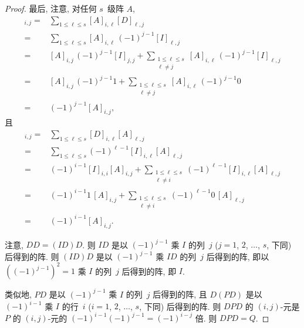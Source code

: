 \documentclass[../libro.tex]{subfiles}
\begin{document}
\begin{proof}
    最后, 注意, 对任何 \(s\)~级阵 \(A\),
    \begin{align*}
        [A D]_{i,j}
        = {} &
        \sum_{1 \leq \ell \leq s} {[A]_{i,\ell} [D]_{\ell,j}}
        \\
        = {} &
        \sum_{1 \leq \ell \leq s} {[A]_{i,\ell}\, (-1)^{j-1} [I]_{\ell,j}}
        \\
        = {} &
        [A]_{i,j}\, (-1)^{j-1} [I]_{j,j}
        + \sum_{\substack{1 \leq \ell \leq s \\ \ell \neq j}}
        {[A]_{i,\ell}\, (-1)^{j-1} [I]_{\ell,j}}
        \\
        = {} &
        [A]_{i,j}\, (-1)^{j-1} 1
        + \sum_{\substack{1 \leq \ell \leq s \\ \ell \neq j}}
        {[A]_{i,\ell}\, (-1)^{j-1} 0}
        \\
        = {} &
        (-1)^{j-1} [A]_{i,j},
    \end{align*}
    且
    \begin{align*}
        [D A]_{i,j}
        = {} &
        \sum_{1 \leq \ell \leq s} {[D]_{i,\ell} [A]_{\ell,j}}
        \\
        = {} &
        \sum_{1 \leq \ell \leq s} {(-1)^{\ell-1} [I]_{i,\ell} [A]_{\ell,j}}
        \\
        = {} &
        (-1)^{i-1} [I]_{i,i} [A]_{i,j}
        + \sum_{\substack{1 \leq \ell \leq s \\ \ell \neq i}}
        {(-1)^{\ell-1} [I]_{i,\ell} [A]_{\ell,j}}
        \\
        = {} &
        (-1)^{i-1} 1\, [A]_{i,j}
        + \sum_{\substack{1 \leq \ell \leq s \\ \ell \neq i}}
        {(-1)^{\ell-1} 0\, [A]_{\ell,j}}
        \\
        = {} &
        (-1)^{i-1} [A]_{i,j}.
    \end{align*}

    注意, \(D D = (I D) D\).
    则 \(I D\) 是以 \((-1)^{j-1}\) 乘 \(I\) 的列~\(j\)
    (\(j = 1\), \(2\), \(\dots\), \(s\), 下同) 后得到的阵.
    则 \((I D) D\) 是以 \((-1)^{j-1}\) 乘 \(I D\) 的列~\(j\) 后得到的阵,
    即以 \(((-1)^{j-1})^2 = 1\) 乘 \(I\) 的列~\(j\) 后得到的阵,
    即 \(I\).

    类似地,
    \(P D\) 是以 \((-1)^{j-1}\) 乘 \(I\) 的列~\(j\) 后得到的阵,
    且 \(D (P D)\) 是以 \((-1)^{i-1}\) 乘 \(I\) 的行~\(i\)
    (\(i = 1\), \(2\), \(\dots\), \(s\), 下同) 后得到的阵.
    则 \(D P D\) 的 \((i, j)\)-元是 \(P\) 的 \((i, j)\)-元的
    \((-1)^{i-1} (-1)^{j-1} = (-1)^{i-j}\) 倍.
    则 \(D P D = Q\).
\end{proof}
\end{document}
